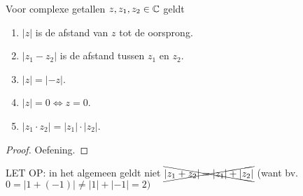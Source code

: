 \documentclass{ximera}
\begin{document}
\begin{proposition}\label{eig:complexe_modulus}
	Voor complexe getallen $z,z_1,z_2\in \mathbb{C}$ geldt
	\begin{enumerate}
		\item $|z|$ is de afstand van $z$ tot de oorsprong.
		\item $|z_1-z_2|$ is de afstand tussen $z_1$ en $z_2$.
		\item $|z|= |-z|$.		
		\item $|z|=0 \iff  z=0 $.
		\item $|z_1\cdot z_2| = |z_1| \cdot |z_2|$.
		
		
	\end{enumerate}

	\begin{proof}
		Oefening. 
	\end{proof}
	LET OP: in het algemeen geldt niet $\xcancel{|z_1+z_2| = |z_1|+|z_2|}$ (want bv. $0= |1+(-1)| \neq |1|+|-1| = 2)$


	
\end{proposition}

\end{document}
